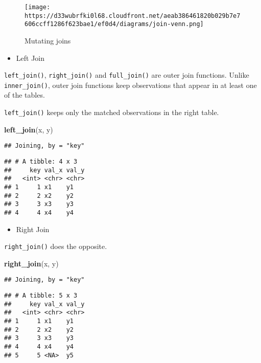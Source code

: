 \documentclass[
]{book}
\newenvironment{Shaded}{\begin{snugshade}}{\end{snugshade}}
\newcommand{\KeywordTok}[1]{\textcolor[rgb]{0.13,0.29,0.53}{\textbf{#1}}}
\newcommand{\NormalTok}[1]{#1}
\providecommand{\tightlist}{%
  \setlength{\itemsep}{0pt}\setlength{\parskip}{0pt}}
\begin{document}
\begin{figure}
\centering
\texttt{[image: https://d33wubrfki0l68.cloudfront.net/aeab386461820b029b7e7606ccff1286f623bae1/ef0d4/diagrams/join-venn.png]}
\caption{Mutating joins}
\end{figure}

\begin{itemize}
\tightlist
\item
  Left Join
\end{itemize}

\texttt{left\_join()}, \texttt{right\_join()} and \texttt{full\_join()} are outer join functions. Unlike \texttt{inner\_join()}, outer join functions keep observations that appear in at least one of the tables.

\texttt{left\_join()} keeps only the matched observations in the right table.

\begin{Shaded}
\begin{Highlighting}[]
\KeywordTok{left\_join}\NormalTok{(x, y)}
\end{Highlighting}
\end{Shaded}

\begin{verbatim}
## Joining, by = "key"
\end{verbatim}

\begin{verbatim}
## # A tibble: 4 x 3
##     key val_x val_y
##   <int> <chr> <chr>
## 1     1 x1    y1   
## 2     2 x2    y2   
## 3     3 x3    y3   
## 4     4 x4    y4
\end{verbatim}

\begin{itemize}
\tightlist
\item
  Right Join
\end{itemize}

\texttt{right\_join()} does the opposite.

\begin{Shaded}
\begin{Highlighting}[]
\KeywordTok{right\_join}\NormalTok{(x, y)}
\end{Highlighting}
\end{Shaded}

\begin{verbatim}
## Joining, by = "key"
\end{verbatim}

\begin{verbatim}
## # A tibble: 5 x 3
##     key val_x val_y
##   <int> <chr> <chr>
## 1     1 x1    y1   
## 2     2 x2    y2   
## 3     3 x3    y3   
## 4     4 x4    y4   
## 5     5 <NA>  y5
\end{verbatim}
\end{document}
